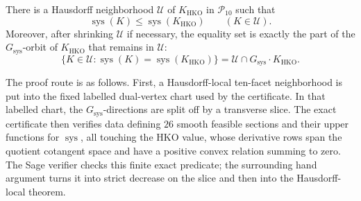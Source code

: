 \begin{theorem}
\label{thm:hko-ten-facet-local-maximum}
There is a Hausdorff neighborhood \(\mathcal U\) of \(K_{\mathrm{HKO}}\) in
\(\mathcal P_{10}\) such that
\[
  \operatorname{sys}(K)\leq \operatorname{sys}(K_{\mathrm{HKO}})
  \qquad (K\in\mathcal U).
\]
Moreover, after shrinking \(\mathcal U\) if necessary, the equality set is
exactly the part of the \(G_{\operatorname{sys}}\)-orbit of
\(K_{\mathrm{HKO}}\) that remains in \(\mathcal U\):
\[
  \{K\in\mathcal U:
    \operatorname{sys}(K)=\operatorname{sys}(K_{\mathrm{HKO}})\}
  =
  \mathcal U\cap G_{\operatorname{sys}}\cdot K_{\mathrm{HKO}}.
\]
\end{theorem}

The proof route is as follows. First, a Hausdorff-local ten-facet neighborhood
is put into the fixed labelled dual-vertex chart used by the certificate. In
that labelled chart, the \(G_{\operatorname{sys}}\)-directions are split off by
a transverse slice. The
exact certificate then verifies data defining \(26\) smooth feasible sections
and their upper functions for \(\operatorname{sys}\), all touching the HKO value, whose
derivative rows span the quotient cotangent space and have a positive convex
relation summing to zero. The Sage verifier checks this finite exact predicate;
the surrounding hand argument turns it into strict decrease on the slice and
then into the Hausdorff-local theorem.

